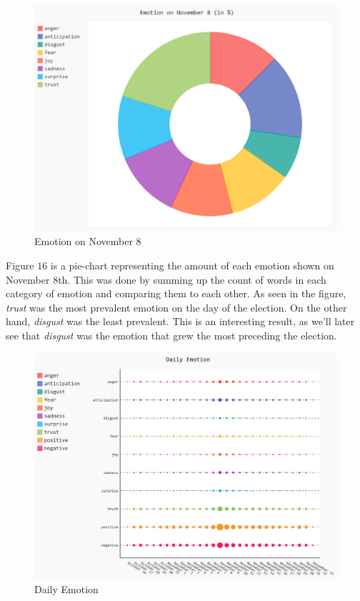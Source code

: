 \documentclass[letterpaper]{article}
\begin{document}
\begin{figure}[!htb]
\begin{center}
\includegraphics[scale=0.38]{Images/emotion-on-nov-8.PNG}
\caption{Emotion on November 8}
\label{fig1}
\end{center}
\end{figure}

Figure $16$ is a pie-chart representing the amount of each emotion shown on November $8$th. This was done by summing up the count of words in each category of emotion and comparing them to each other. As seen in the figure, \textit{trust} was the most prevalent emotion on the day of the election. On the other hand, \textit{disgust} was the least prevalent. This is an interesting result, as we'll later see that \textit{disgust} was the emotion that grew the most preceding the election.

\begin{figure}[!htb]
\begin{center}
\includegraphics[scale=0.3]{Images/daily-emotion-all.PNG}
\caption{Daily Emotion}
\label{fig1}
\end{center}
\end{figure}
\end{document}
